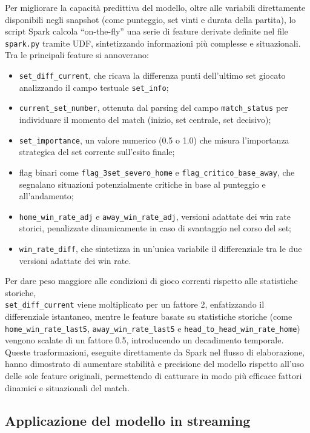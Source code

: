 \documentclass[a4paper,12pt]{report}
\begin{document}
Per migliorare la capacità predittiva del modello, oltre alle variabili direttamente disponibili negli snapshot (come punteggio, set vinti e durata della partita), lo script Spark calcola “on-the-fly” una serie di feature derivate definite nel file \texttt{spark.py} tramite UDF, sintetizzando informazioni più complesse e situazionali. Tra le principali feature si annoverano:
\begin{itemize}
  \item \texttt{set\_diff\_current}, che ricava la differenza punti dell’ultimo set giocato analizzando il campo testuale \texttt{set\_info};
  \item \texttt{current\_set\_number}, ottenuta dal parsing del campo \texttt{match\_status} per individuare il momento del match (inizio, set centrale, set decisivo);
  \item \texttt{set\_importance}, un valore numerico (0.5 o 1.0) che misura l’importanza strategica del set corrente sull’esito finale;
  \item flag binari come \texttt{flag\_3set\_severo\_home} e \texttt{flag\_critico\_base\_away}, che segnalano situazioni potenzialmente critiche in base al punteggio e all’andamento;
  \item \texttt{home\_win\_rate\_adj} e \texttt{away\_win\_rate\_adj}, versioni adattate dei win rate storici, penalizzate dinamicamente in caso di svantaggio nel corso del set;
  \item \texttt{win\_rate\_diff}, che sintetizza in un’unica variabile il differenziale tra le due versioni adattate dei win rate.
\end{itemize}
Per dare peso maggiore alle condizioni di gioco correnti rispetto alle statistiche storiche,\\ \texttt{set\_diff\_current} viene moltiplicato per un fattore 2, enfatizzando il differenziale istantaneo, mentre le feature basate su statistiche storiche (come \texttt{home\_win\_rate\_last5}, \texttt{away\_win\_rate\_last5} e  \texttt{head\_to\_head\_win\_rate\_home}) vengono scalate di un fattore 0.5, introducendo un decadimento temporale. Queste trasformazioni, eseguite direttamente da Spark nel flusso di elaborazione, hanno dimostrato di aumentare stabilità e precisione del modello rispetto all’uso delle sole feature originali, permettendo di catturare in modo più efficace fattori dinamici e situazionali del match.



\subsection{Applicazione del modello in streaming}
\end{document}
